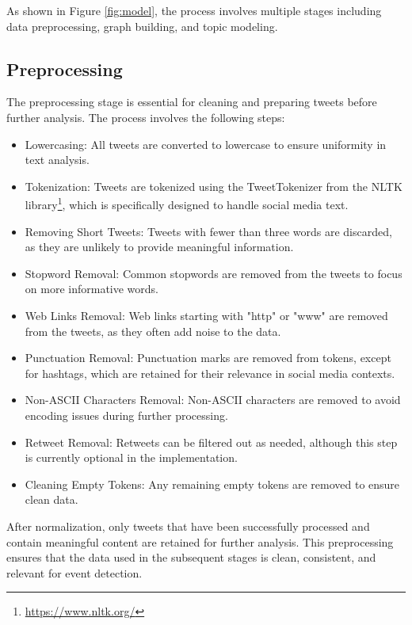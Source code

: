As shown in Figure \ref{fig:model}, the process involves multiple stages including data preprocessing, graph building, and topic modeling.

\subsection{Preprocessing}
\label{sec:preprocessing}
The preprocessing stage is essential for cleaning and preparing tweets before further analysis. The process involves the following steps:
\begin{itemize}
\item Lowercasing: All tweets are converted to lowercase to ensure uniformity in text analysis.

\item Tokenization: Tweets are tokenized using the TweetTokenizer from the NLTK library\footnote{\url{https://www.nltk.org/}}, which is specifically designed to handle social media text.

\item Removing Short Tweets: Tweets with fewer than three words are discarded, as they are unlikely to provide meaningful information.

\item Stopword Removal: Common stopwords are removed from the tweets to focus on more informative words.

\item Web Links Removal: Web links starting with "http" or "www" are removed from the tweets, as they often add noise to the data.

\item Punctuation Removal: Punctuation marks are removed from tokens, except for hashtags, which are retained for their relevance in social media contexts.

\item Non-ASCII Characters Removal: Non-ASCII characters are removed to avoid encoding issues during further processing.

\item Retweet Removal: Retweets can be filtered out as needed, although this step is currently optional in the implementation.

\item Cleaning Empty Tokens: Any remaining empty tokens are removed to ensure clean data.
\end{itemize}
After normalization, only tweets that have been successfully processed and contain meaningful content are retained for further analysis. This preprocessing ensures that the data used in the subsequent stages is clean, consistent, and relevant for event detection.

